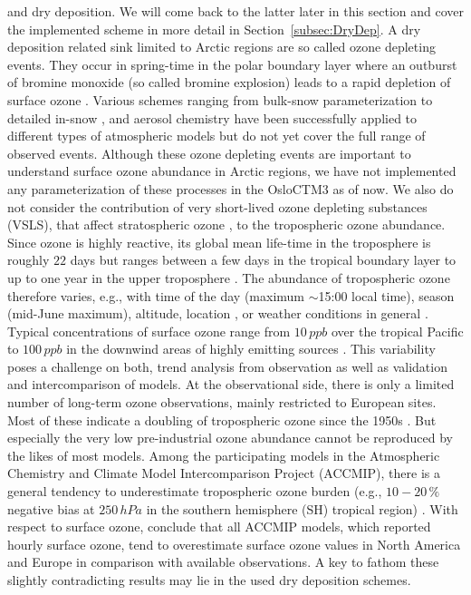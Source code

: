 \documentclass[gmd, manuscript]{copernicus}
\begin{document}
and dry deposition. We will come back to the latter later in this section and cover the implemented scheme in more detail in Section~\ref{subsec:DryDep}. A dry deposition related sink limited to Arctic regions are so called ozone depleting events. They occur in spring-time in the polar boundary layer where an outburst of bromine monoxide  (so called bromine explosion) leads to a rapid depletion of surface ozone \citep{JGR:Oltmans1981,GRL:Bottenheim1986,Nat:Barrie1988,JGR:Bottenheim2006}. Various schemes ranging from bulk-snow parameterization \citep{ACP:Toyota2011,GMD:Falk2018} to detailed in-snow \citep{ACP:Toyota2014a}, and aerosol chemistry \citep{ACP:Yang2010} have been successfully applied to different types of atmospheric models but do not yet cover the full range of observed events. Although these ozone depleting events are important to understand surface ozone abundance in Arctic regions, we have not implemented any parameterization of these processes in the OsloCTM3 as of now. We also do not consider the contribution of very short-lived ozone depleting substances (VSLS), that affect stratospheric ozone \citep{JGR:Warwick2006, ACP:Ziska2013, ACP:Hossaini2016, ACP:Falk2017}, to the tropospheric ozone abundance.\\
Since ozone is highly reactive, its global mean life-time in the troposphere is roughly $22$ days but ranges between a few days in the tropical boundary layer to up to one year in the upper troposphere \citep{JGR:Stevenson2005,ACP:Young2013}. The abundance of tropospheric ozone therefore varies, e.g., with time of the day (maximum $\sim$15:00 local time), season (mid-June maximum), altitude, location \citep{ACP:Schnell2015}, or weather conditions in general \citep{ACP:Otero2018}. Typical concentrations of surface ozone range from $10\,\unit{ppb}$ over the tropical Pacific to $100\,\unit{ppb}$ in the downwind areas of highly emitting sources \citep[Chapter 8]{IPCC2013}. This variability poses a challenge on both, trend analysis from observation as well as validation and intercomparison of models. At the observational side, there is only a limited number of long-term ozone observations, mainly restricted to European sites. Most of these indicate a doubling of tropospheric ozone since the 1950s \citep[Chapter 2]{IPCC2013}. But especially the very low pre-industrial ozone abundance cannot be reproduced by the likes of most models. Among the participating models in the Atmospheric Chemistry and Climate Model Intercomparison Project (ACCMIP), there is a general tendency to underestimate tropospheric ozone burden (e.g., $10-20\,\unit{\%}$ negative bias at $250\,\unit{hPa}$ in the southern hemisphere (SH) tropical region) \citep[Chapter 8]{IPCC2013}. With respect to surface ozone, \citet{ACP:Schnell2015} conclude that all ACCMIP models, which reported hourly surface ozone, tend to overestimate surface ozone values in North America and Europe in comparison with available observations. A key to fathom these slightly contradicting results may lie in the used dry deposition schemes.\\
\end{document}

